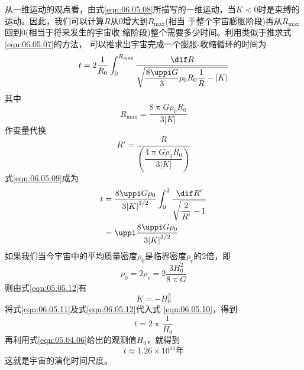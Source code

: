 \documentclass[../outline-of-mechanics.tex]{subfiles}
\begin{document}
从一维运动的观点看，由式\eqref{eqn:06.05.08}所描写的一维运动，当$ K
  <0 $时是束缚的运动。因此，我们可以计算$ R $从0增大到$ R_{\max} $(相当
于整个宇宙膨胀阶段)再从$ R_{\max} $回到0(相当于将来发生的宇宙收
缩阶段)整个需要多少时间。利用类似于推求式\eqref{eqn:06.05.07}的方法，
可以推求出宇宙完成一个膨胀-收缩循环的时间为
\begin{equation}\label{eqn:06.05.09}
  t = 2 \frac { 1 } { R _ { 0 } } \int _ 0 ^ { R _ { \max } } \frac { \dif R } { \sqrt { \dfrac { 8 \uppi G } { 3 } \rho _ { 0 } R _ { 0 } \dfrac { 1 } { R } - | K | } }
\end{equation}
其中
\begin{equation*}
  R _ { \max } = \frac { 8 \uppi G \rho _ { 0 } R _ { 0 } } { 3 | K | }
\end{equation*}
作变量代换
\begin{equation*}
  R ' = \frac { R } { \left( \dfrac { 4 \uppi G \rho _ { 0 } R _ { 0 } } { 3 | K | } \right) }
\end{equation*}
式\eqref{eqn:06.05.09}成为
\begin{equation}\label{eqn:06.05.10}
  \begin{aligned}
    t & = \frac { 8 \uppi G \rho _ { 0 } } { 3 { | K | } ^ { 3 / 2 } } \int _ { 0 } ^ { 2 } \frac { \dif R ' } { \sqrt { \dfrac { 2 } { R ' } - 1 } } \\
      & = \uppi \frac { 8 \uppi G \rho _ { 0 } } { 3 { | K | } ^ { 3 / 2 } }
  \end{aligned}
\end{equation}
如果我们当今宇宙中的平均质量密度$ \rho _ 0 $是临界密度$ \rho _ c $的2倍，即
\begin{equation}\label{eqn:06.05.11}
  \rho _ { 0 } = 2 \rho _ { c } = 2 \frac { 3 H _ 0 ^ { 2 } } { 8 \uppi G }
\end{equation}
则由式\eqref{eqn:05.05.12}有
\begin{equation}\label{eqn:06.05.12}
  K = - H _ { 0 } ^ { 2 }
\end{equation}
将式\eqref{eqn:06.05.11}及式\eqref{eqn:06.05.12}代入式 \eqref{eqn:06.05.10}，得到
\begin{equation}\label{eqn:06.05.13}
  t = 2 \uppi \frac { 1 } { H _ { 0 } }
\end{equation}
再利用式\eqref{eqn:05.04.06}给出的观测值$ H _ { 0 } $，就得到
\begin{equation*}
  t \approx 1.26 \times 10 ^ { 11 } \text{年}
\end{equation*}
这就是宇宙的演化时间尺度。
\end{document}
